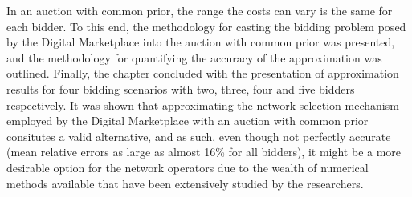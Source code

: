  In an auction with common prior, the range the costs can vary is the same for each bidder. To this end, the methodology for casting the bidding problem posed by the Digital Marketplace into the auction with common prior was presented, and the methodology for quantifying the accuracy of the approximation was outlined. Finally, the chapter concluded with the presentation of approximation results for four bidding scenarios with two, three, four and five bidders respectively. It was shown that approximating the network selection mechanism employed by the Digital Marketplace with an auction with common prior consitutes a valid alternative, and as such, even though not perfectly accurate (mean relative errors as large as almost 16\% for all bidders), it might be a more desirable option for the network operators due to the wealth of numerical methods available that have been extensively studied by the researchers.

